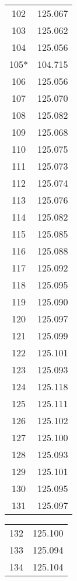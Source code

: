 \begin{multicols}{3}
\begin{table}[H]
\begin{tabular}{|c|c|}
            102 & 125.067 \\
            103 & 125.062 \\
            104 & 125.056 \\
            105* & 104.715 \\
            106 & 125.056 \\
            107 & 125.070 \\
            108 & 125.082 \\
            109 & 125.068 \\
            110 & 125.075 \\
            111 & 125.073 \\
            112 & 125.074 \\
            113 & 125.076 \\
            114 & 125.082 \\
            115 & 125.085 \\
            116 & 125.088 \\
            117 & 125.092 \\
            118 & 125.095 \\
            119 & 125.090 \\
            120 & 125.097 \\
            121 & 125.099 \\
            122 & 125.101 \\
            123 & 125.093 \\
            124 & 125.118 \\
            125 & 125.111 \\
            126 & 125.102 \\
            127 & 125.100 \\
            128 & 125.093 \\
            129 & 125.101 \\
            130 & 125.095 \\
            131 & 125.097 \\
            \hline
        \end{tabular}
    \end{table}
    \columnbreak
    \begin{table}[H]
        \centering
        \begin{tabular}{|c|c|}
            \hline
            132 & 125.100 \\
            133 & 125.094 \\
            134 & 125.104 \\

\end{tabular}
\end{table}
\end{multicols}
